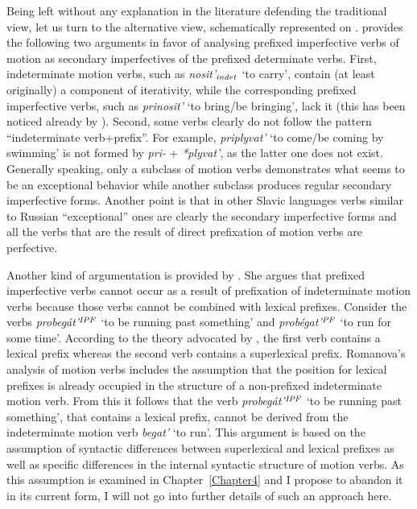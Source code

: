 Being left without any explanation in the literature defending the traditional view, let us turn to the alternative view, schematically represented on . \citet{Regnell:44} provides the following two arguments in favor of analysing prefixed imperfective verbs of motion as secondary imperfectives of the prefixed determinate verbs. First, indeterminate motion verbs, such as \textit{nosit'}$_{\mathit{indet}}$ `to carry', contain (at least originally) a component of iterativity, while the corresponding prefixed imperfective verbs, such as \textit{prinosit'} `to bring/be bringing', lack it (this has been noticed already by \citealt{Mazon:1928}). Second, some verbs clearly do not follow the pattern ``indeterminate verb+prefix''. For example, \textit{priplyvat'} `to come/be coming by swimming' is not formed by \textit{pri-} + \textit{*plyvat'}, as the latter one does not exist. Generally speaking, only a subclass of motion verbs demonstrates what seems to be an exceptional behavior while another subclass produces regular secondary imperfective forms. Another point is that in other Slavic languages verbs similar to Russian ``exceptional'' ones are clearly the secondary imperfective forms and all the verbs that are the result of direct prefixation of motion verbs are perfective.

Another kind of argumentation is provided by \citet[146]{Romanova:06}. She argues that prefixed imperfective verbs cannot occur as a result of prefixation of indeterminate motion verbs because those verbs cannot be combined with lexical prefixes. Consider the verbs \textit{probeg\'{a}t'}$^{{\mathit{IPF}}}$ `to be running past something' and \textit{prob\'{e}g{a}t'}$^{{\mathit{PF}}}$ `to run for some time'. According to the theory advocated by \citet{Romanova:06}, the first verb contains a lexical prefix whereas the second verb contains a superlexical prefix. Romanova's analysis of motion verbs includes the assumption that the position for lexical prefixes is already occupied in the structure of a non-prefixed indeterminate motion verb. From this it follows that the verb \textit{probeg\'{a}t'}$^{{\mathit{IPF}}}$ `to be running past something', that contains a lexical prefix, cannot be derived from the indeterminate motion verb \textit{begat'} `to run'. This argument is based on the assumption of syntactic differences between superlexical and lexical prefixes as well as specific differences in the internal syntactic structure of motion verbs. As this assumption is examined in Chapter~\ref{Chapter4} and I propose to abandon it in its current form, I will not go into further details of such an approach here.

